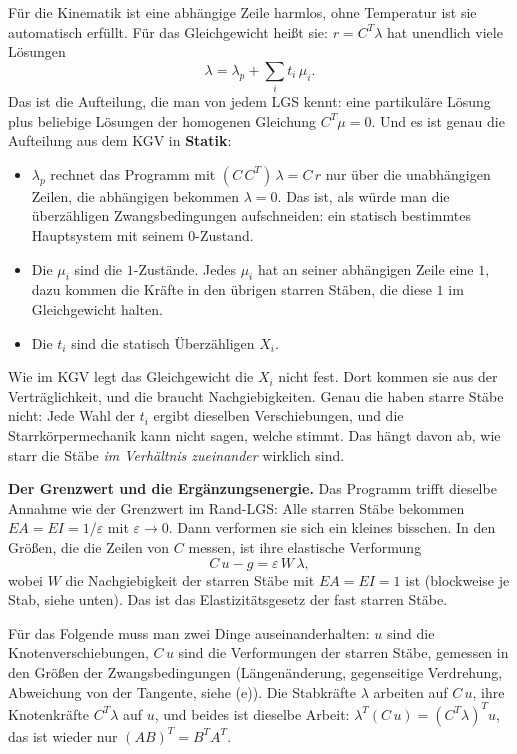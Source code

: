 Für die Kinematik ist eine abhängige Zeile harmlos, ohne Temperatur ist sie automatisch erfüllt. Für
das Gleichgewicht heißt sie: $r = C^T\lambda$ hat unendlich viele Lösungen
\[
  \lambda = \lambda_p + \sum_i t_i\,\mu_i .
\]
Das ist die Aufteilung, die man von jedem LGS kennt: eine partikuläre Lösung plus beliebige
Lösungen der homogenen Gleichung $C^T\mu = 0$. Und es ist genau die Aufteilung aus dem KGV in
\textbf{Statik}:
\begin{itemize}
  \item $\lambda_p$ rechnet das Programm mit $(C\,C^T)\,\lambda = C\,r$ nur über die unabhängigen
        Zeilen, die abhängigen bekommen $\lambda = 0$. Das ist, als würde man die überzähligen
        Zwangsbedingungen aufschneiden: ein statisch bestimmtes Hauptsystem mit seinem
        $0$-Zustand.
  \item Die $\mu_i$ sind die $1$-Zustände. Jedes $\mu_i$ hat an seiner abhängigen Zeile eine $1$,
        dazu kommen die Kräfte in den übrigen starren Stäben, die diese $1$ im Gleichgewicht halten.
  \item Die $t_i$ sind die statisch Überzähligen $X_i$.
\end{itemize}
Wie im KGV legt das Gleichgewicht die $X_i$ nicht fest. Dort kommen sie aus der Verträglichkeit,
und die braucht Nachgiebigkeiten. Genau die haben starre Stäbe nicht: Jede Wahl der $t_i$ ergibt
dieselben Verschiebungen, und die Starrkörpermechanik kann nicht sagen, welche stimmt. Das hängt
davon ab, wie starr die Stäbe \emph{im Verhältnis zueinander} wirklich sind.

\textbf{Der Grenzwert und die Ergänzungsenergie.} Das Programm trifft dieselbe Annahme wie der
Grenzwert im Rand-LGS: Alle starren Stäbe bekommen $EA = EI = 1/\varepsilon$ mit
$\varepsilon \to 0$. Dann verformen sie sich ein kleines bisschen. In den Größen, die die Zeilen
von $C$ messen, ist ihre elastische Verformung
\[
  C\,u - g = \varepsilon\,W\,\lambda ,
\]
wobei $W$ die Nachgiebigkeit der starren Stäbe mit $EA = EI = 1$ ist (blockweise je Stab, siehe
unten). Das ist das Elastizitätsgesetz der fast starren Stäbe.

Für das Folgende muss man zwei Dinge auseinanderhalten: $u$ sind die Knotenverschiebungen, $C\,u$
sind die Verformungen der starren Stäbe, gemessen in den Größen der Zwangsbedingungen
(Längenänderung, gegenseitige Verdrehung, Abweichung von der Tangente, siehe (e)). Die Stabkräfte
$\lambda$ arbeiten auf $C\,u$, ihre Knotenkräfte $C^T\lambda$ auf $u$, und beides ist dieselbe
Arbeit: $\lambda^T (C\,u) = (C^T\lambda)^T u$, das ist wieder nur $(AB)^T = B^T A^T$.

